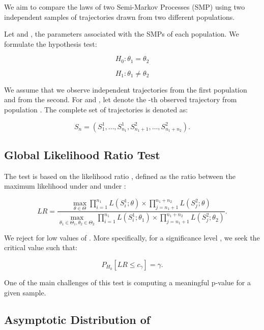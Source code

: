 \documentclass[
]{article}
\begin{document}
We aim to compare the laws of two Semi-Markov Processes (SMP) using two
independent samples of trajectories drawn from two different
populations.

Let and , the parameters associated with the SMPs of each population. We
formulate the hypothesis test:

\begin{equation}
H_0: \theta_1 = \theta_2
\end{equation}

\begin{equation}
H_1: \theta_1 \neq \theta_2
\end{equation}

We assume that we observe independent trajectories from the first
population and from the second. For and , let denote the -th observed
trajectory from population . The complete set of trajectories is denoted
as:

\begin{equation}
S_n = (S_1^1, \dots, S_{n_1}^1, S_{n_1+1}^2, \dots, S_{n_1+n_2}^2).
\end{equation}

\subsection{Global Likelihood Ratio Test}

The test is based on the likelihood ratio , defined as the ratio between
the maximum likelihood under and under :

\begin{equation}
LR =
\frac{\max_{\theta \in \Theta} \prod_{i=1}^{n_1} L(S_i^1; \theta) \times \prod_{j=n_1+1}^{n_1+n_2} L(S_j^2; \theta)}
{\max_{\theta_1 \in \Theta_1, \theta_2 \in \Theta_2} \prod_{i=1}^{n_1} L(S_i^1; \theta_1) \times \prod_{j=n_1+1}^{n_1+n_2} L(S_j^2; \theta_2)}.
\end{equation}

We reject for low values of . More specifically, for a significance
level , we seek the critical value such that:

\begin{equation}
P_{H_0} [LR \leq c_\gamma ] = \gamma.
\end{equation}

One of the main challenges of this test is computing a meaningful
p-value for a given sample.

\subsection{Asymptotic Distribution of }
\end{document}
